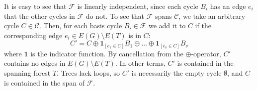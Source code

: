\documentclass[fleqn,11pt]{article}
\newcommand\calF{\mathcal{F}}
\newcommand\CycSp{\mathcal{C}}    %
\begin{document}
It is easy to see that $\calF$ is linearly independent, since each cycle $B_i$ has an edge $e_i$ that the other cycles in $\calF$ do not. To see that $\calF$ spans $\CycSp$, we take an arbitrary cycle $C\in\CycSp$. Then, for each basis cycle $B_i\in\calF$ we add it to $C$ if the corresponding edge $e_i\in E(G)\setminus E(T)$ is in $C$:
\begin{equation}
	C' = C\oplus \bm{1}_{[e_1\in C]}B_1\oplus\hdots\oplus\bm{1}_{[e_\nu \in C]}B_\nu
\end{equation}
where $\bm{1}$ is the indicator function. By cancellation from the $\oplus$-operator, $C'$ contains no edges in $E(G)\setminus E(T)$. In other terms, $C'$ is contained in the spanning forest $T$. Trees lack loops, so $C'$ is necessarily the empty cycle $\emptyset$, and $C$ is contained in the span of $\calF$.

%



\end{document}
